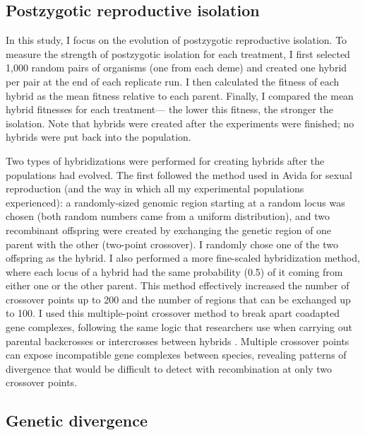 \begin{doublespace}
\subsection{Postzygotic reproductive isolation}

In this study,
I focus on the evolution of postzygotic reproductive isolation.
%
To measure the strength of postzygotic isolation for each treatment,
I first selected 1,000 random pairs of organisms (one from each deme)
and created one hybrid per pair at the end of each replicate run.
%
I then calculated the fitness of each hybrid
as the mean fitness relative to each parent.
%
Finally, I compared the mean hybrid fitnesses for each treatment---%
the lower this fitness, the stronger the isolation.
%
Note that hybrids were created
after the experiments were finished;
no hybrids were put back into the population.



Two types of hybridizations were performed for creating hybrids
after the populations had evolved.
%
The first followed the method used in Avida for sexual reproduction
(and the way in which all my experimental populations experienced):
a randomly-sized genomic region starting at a random locus was chosen
(both random numbers came from a uniform distribution),
and two recombinant offspring were created by exchanging
the genetic region of one parent with the other (two-point crossover).
%
I randomly chose one of the two offspring as the hybrid.
%
I also performed a more fine-scaled hybridization method,
where each locus of a hybrid had the same probability (0.5)
of it coming from either one or the other parent.
%
This method effectively increased the number of crossover points up to 200
and the number of regions that can be exchanged up to 100.
%
I used this multiple-point crossover method
to break apart coadapted gene complexes,
following the same logic that researchers
use when carrying out parental backcrosses
or intercrosses between hybrids \citep[e.g.,][]{li97,bur99}.
%
Multiple crossover points can expose
incompatible gene complexes between species,
revealing patterns of divergence
that would be difficult to detect with
recombination at only two crossover points.



\subsection{Genetic divergence}




\end{doublespace}
